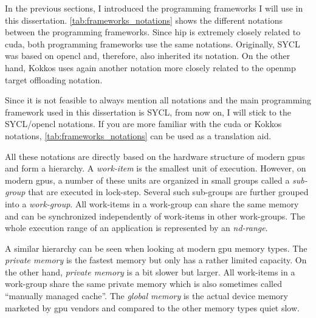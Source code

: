 In the previous sections, I introduced the programming frameworks I will use in this dissertation. 
\autoref{tab:frameworks_notations} shows the different notations between the programming frameworks. 
Since \gls{hip} is extremely closely related to \gls{cuda}, both programming frameworks use the same notations. 
Originally, SYCL was based on \gls{opencl} and, therefore, also inherited its notation. 
On the other hand, Kokkos uses again another notation more closely related to the \gls{openmp} target offloading notation. 

Since it is not feasible to always mention all notations and the main programming framework used in this dissertation is SYCL, from now on, I will stick to the SYCL/\gls{opencl} notations. 
If you are more familiar with the \gls{cuda} or Kokkos notations, \autoref{tab:frameworks_notations} can be used as a translation aid. 

All these notations are directly based on the hardware structure of modern \glspl{gpu} and form a hierarchy. 
A \textit{work-item} is the smallest unit of execution. 
However, on modern \glspl{gpu}, a number of these units are organized in small groups called a \textit{sub-group} that are executed in lock-step. 
Several such sub-groups are further grouped into a \textit{work-group}. 
All work-items in a work-group can share the same memory and can be synchronized independently of work-items in other work-groups. 
The whole execution range of an application is represented by an \textit{nd-range}.

A similar hierarchy can be seen when looking at modern \gls{gpu} memory types. 
The \textit{private memory} is the fastest memory but only has a rather limited capacity. 
On the other hand, \textit{private memory} is a bit slower but larger. 
All work-items in a work-group share the same private memory which is also sometimes called \enquote{manually managed cache}. 
The \textit{global memory} is the actual device memory marketed by \gls{gpu} vendors and compared to the other memory types quiet slow. 
